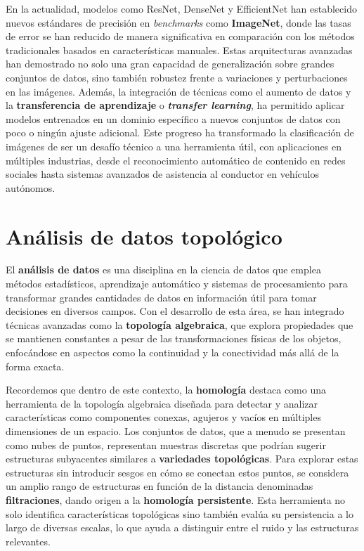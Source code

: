 En la actualidad, modelos como ResNet, DenseNet y EfficientNet han establecido nuevos estándares de precisión en \textit{benchmarks} como \textbf{ImageNet}, donde las tasas de error se han reducido de manera significativa en comparación con los métodos tradicionales basados en características manuales. Estas arquitecturas avanzadas han demostrado no solo una gran capacidad de generalización sobre grandes conjuntos de datos, sino también robustez frente a variaciones y perturbaciones en las imágenes. Además, la integración de técnicas como el aumento de datos y la \textbf{transferencia de aprendizaje} o \textbf{\textit{transfer learning}}, ha permitido aplicar modelos entrenados en un dominio específico a nuevos conjuntos de datos con poco o ningún ajuste adicional. Este progreso ha transformado la clasificación de imágenes de ser un desafío técnico a una herramienta útil, con aplicaciones en múltiples industrias, desde el reconocimiento automático de contenido en redes sociales hasta sistemas avanzados de asistencia al conductor en vehículos autónomos.

\section{Análisis de datos topológico}

El \textbf{análisis de datos} es una disciplina en la ciencia de datos que emplea métodos estadísticos, aprendizaje automático y sistemas de procesamiento para transformar grandes cantidades de datos en información útil para tomar decisiones en diversos campos. Con el desarrollo de esta área, se han integrado técnicas avanzadas como la \textbf{topología algebraica}, que explora propiedades que se mantienen constantes a pesar de las transformaciones físicas de los objetos, enfocándose en aspectos como la continuidad y la conectividad más allá de la forma exacta.

Recordemos que dentro de este contexto, la \textbf{homología} destaca como una herramienta de la topología algebraica diseñada para detectar y analizar características como componentes conexas, agujeros y vacíos en múltiples dimensiones de un espacio. Los conjuntos de datos, que a menudo se presentan como nubes de puntos, representan muestras discretas que podrían sugerir estructuras subyacentes similares a \textbf{variedades topológicas}. Para explorar estas estructuras sin introducir sesgos en cómo se conectan estos puntos, se considera un amplio rango de estructuras en función de la distancia denominadas \textbf{filtraciones}, dando origen a la \textbf{homología persistente}. Esta herramienta no solo identifica características topológicas sino también evalúa su persistencia a lo largo de diversas escalas, lo que ayuda a distinguir entre el ruido y las estructuras relevantes.

